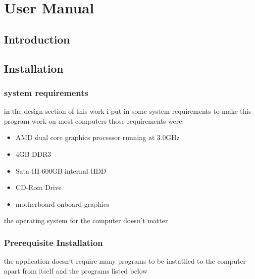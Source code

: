 \chapter{User Manual}

\section{Introduction}

\section{Installation}
\subsection{system requirements}
in the design section of this work i put in some system requirements to make this program work on most computers those requirements were:
\begin{itemize}
	\item AMD dual core graphics processor running at 3.0GHz
	\item 4GB DDR3 
	\item Sata III 600GB internal HDD
	\item CD-Rom Drive
	\item motherboard onboard graphics
\end{itemize}
the operating system for the computer doesn't matter
\subsection{Prerequisite Installation}
the application doesn't require many programs to be instatlled to the computer apart from itself and the programs listed below 

